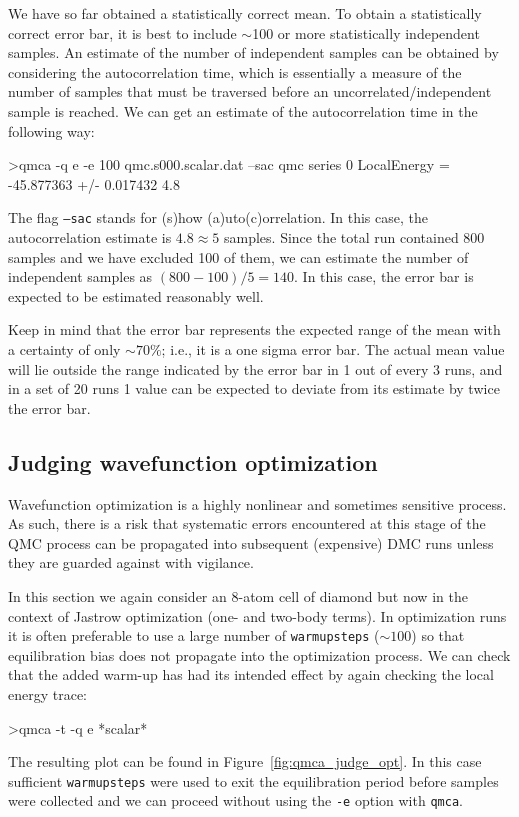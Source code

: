 We have so far obtained a statistically correct mean.  To obtain 
a statistically correct error bar, it is best to include $\sim$100 or more 
statistically independent samples.  An estimate of the number 
of independent samples can be obtained by considering the 
autocorrelation time, which is essentially a measure of the number of 
samples that must be traversed before an uncorrelated/independent sample 
is reached.  We can get an estimate of the autocorrelation time 
in the following way:
\begin{shade}
>qmca -q e -e 100 qmc.s000.scalar.dat --sac
qmc  series 0  LocalEnergy           =  -45.877363 +/- 0.017432    4.8 
\end{shade}
\noindent
The flag \texttt{--sac} stands for (s)how (a)uto(c)orrelation.  
In this case, the autocorrelation estimate is $4.8\approx 5$ samples. 
Since the total run contained 800 samples and we have excluded 100 of 
them, we can estimate the number of independent samples as 
$(800-100)/5=140$.  In this case, the error bar is expected to be 
estimated reasonably well.

Keep in mind that the error bar represents the expected range
of the mean with a certainty of only $\sim 70\%$; i.e., it is a one
sigma error bar.  The actual mean value will lie outside the range
indicated by the error bar in 1 out of every 3 runs, and in a set
of 20 runs 1 value can be expected to deviate from its estimate by
twice the error bar.


\subsection{Judging wavefunction optimization}
\label{sec:qmca_judge_opt}
Wavefunction optimization is a highly nonlinear and sometimes 
sensitive process.  As such, there is a risk that systematic 
errors encountered at this stage of the QMC process can be propagated 
into subsequent (expensive) DMC runs unless they are guarded against 
with vigilance.

In this section we again consider an 8-atom cell of diamond but 
now in the context of Jastrow optimization (one- and two-body terms). 
In optimization runs it is often preferable to use a large number 
of \texttt{warmupsteps} ($\sim 100$) so that equilibration bias does 
not propagate into the optimization process.  We can check that 
the added warm-up has had its intended effect by again checking the 
local energy trace:
\begin{shade}
>qmca -t -q e *scalar*
\end{shade}
\noindent
The resulting plot can be found in Figure~\ref{fig:qmca_judge_opt}. 
In this case sufficient \texttt{warmupsteps} were used to exit 
the equilibration period before samples were collected and we can 
proceed without using the \texttt{-e} option with \texttt{qmca}.

